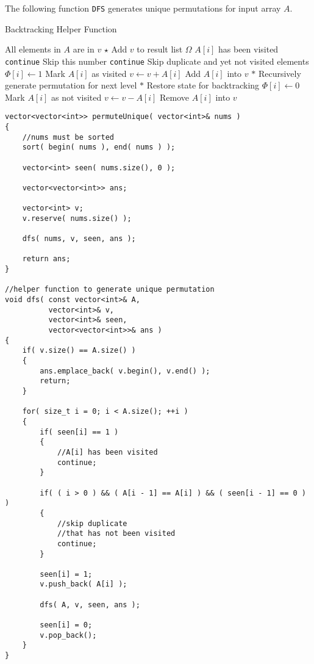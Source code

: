 The following function \texttt{DFS} generates unique permutations for input array $A$.
\begin{algorithm}[H]
\caption{Backtracking Helper Function}
\begin{algorithmic}[1]
 \Comment All elements in $A$ are in $v$
\State $\star$ Add $v$ to result list $\Omega$
\State \Return
\EndIf
{}
 \Comment $A[i]$ has been visited
\State \texttt{continue} \Comment Skip this number
\EndIf
{}
\State \texttt{continue} \Comment Skip duplicate and yet not visited elements
\EndIf
\State $\Phi[i] \gets 1$ \Comment Mark $A[i]$ as visited
\State $v \gets v + A[i]$ \Comment Add $A[i]$ into $v$
\State $\ast$ Recursively generate permutation for next level
\State {}
\State $\ast$ Restore state for backtracking
\State $\Phi[i] \gets 0$ \Comment Mark $A[i]$ as not visited
\State $v \gets v - A[i]$ \Comment Remove $A[i]$ into $v$
\EndFor
\EndFunction
\end{algorithmic}
\end{algorithm}

\setcounter{lstlisting}{0}
\begin{lstlisting}[style=customc, caption={Backtracking By Setting Visited Status}]
vector<vector<int>> permuteUnique( vector<int>& nums )
{
    //nums must be sorted
    sort( begin( nums ), end( nums ) );

    vector<int> seen( nums.size(), 0 );

    vector<vector<int>> ans;

    vector<int> v;
    v.reserve( nums.size() );

    dfs( nums, v, seen, ans );

    return ans;
}

//helper function to generate unique permutation
void dfs( const vector<int>& A,
          vector<int>& v,
          vector<int>& seen,
          vector<vector<int>>& ans )
{
    if( v.size() == A.size() )
    {
        ans.emplace_back( v.begin(), v.end() );
        return;
    }

    for( size_t i = 0; i < A.size(); ++i )
    {
        if( seen[i] == 1 )
        {
            //A[i] has been visited
            continue;
        }

        if( ( i > 0 ) && ( A[i - 1] == A[i] ) && ( seen[i - 1] == 0 ) )
        {
            //skip duplicate
            //that has not been visited
            continue;
        }

        seen[i] = 1;
        v.push_back( A[i] );

        dfs( A, v, seen, ans );

        seen[i] = 0;
        v.pop_back();
    }
}
\end{lstlisting}